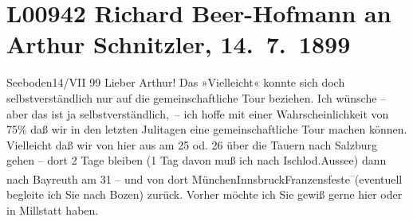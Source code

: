 

\section[Richard Beer-Hofmann an Arthur Schnitzler, 14. 7. 1899]{L00942 Richard Beer-Hofmann an Arthur Schnitzler, 14. 7. 1899}
\nopagebreak{}
\rehead{ }\normalsize\beginnumbering{}
\toendnotes[C]{\smallbreak\pagebreak[2]}
\toendnotes[C]{\smallbreak}
\pstart
           \centering{}{\pb}Seeboden14/VII 99\pend
           \vspace{0.5em}
\pstart
           Lieber Arthur! Das »Vielleicht« konnte sich doch selbstverständlich
               nur auf die gemeinschaftliche Tour beziehen. Ich wünsche – aber das ist ja
               selbstverständlich, – ich hoffe mit einer Wahrscheinlichkeit von 75{\%} daß wir in den letzten Julitagen eine gemeinschaftliche
               Tour machen können. Vielleicht daß wir von hier aus {\pb}am 25 od.
                  26 über die Tauern nach Salzburg gehen – dort 2 Tage bleiben (1 Tag davon muß ich
               nach Ischl\introOben{}od.\introOben{}{ }Aussee) dann nach Bayreuth am 31 – und von dort MünchenInnsbruckFranzensfeste\substVorne{}\textsuperscript{–}\substDazwischen{}(\substHinten{}eventuell begleite ich Sie nach Bozen\introOben{})\introOben{} zurück. Vorher möchte ich Sie gewiß gerne hier oder in
                  Millstatt haben.\pend
           
